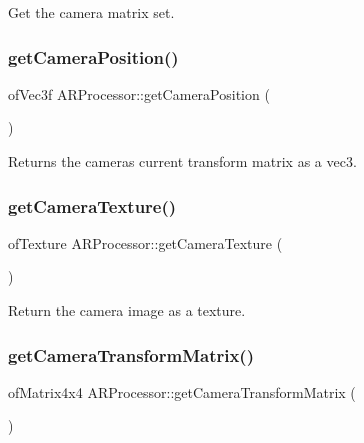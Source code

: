 Get the camera matrix set. 

\mbox{\label{class_a_r_processor_a06030d617c338b3c395c48498733ddb7}} 
\subsubsection{\texorpdfstring{get\+Camera\+Position()}{getCameraPosition()}}
{\footnotesize\ttfamily of\+Vec3f A\+R\+Processor\+::get\+Camera\+Position (\begin{DoxyParamCaption}{ }\end{DoxyParamCaption})}



Returns the camera\textquotesingle{}s current transform matrix as a vec3. 

\mbox{\label{class_a_r_processor_a5eb8045000bc6e0ad3d41d7bbf832047}} 
\subsubsection{\texorpdfstring{get\+Camera\+Texture()}{getCameraTexture()}}
{\footnotesize\ttfamily of\+Texture A\+R\+Processor\+::get\+Camera\+Texture (\begin{DoxyParamCaption}{ }\end{DoxyParamCaption})}



Return the camera image as a texture. 

\mbox{\label{class_a_r_processor_aea093b6d054daa0c75de6f7a492a19ff}} 
\subsubsection{\texorpdfstring{get\+Camera\+Transform\+Matrix()}{getCameraTransformMatrix()}}
{\footnotesize\ttfamily of\+Matrix4x4 A\+R\+Processor\+::get\+Camera\+Transform\+Matrix (\begin{DoxyParamCaption}{ }\end{DoxyParamCaption})\hspace{0.3cm}{\ttfamily [inline]}}



